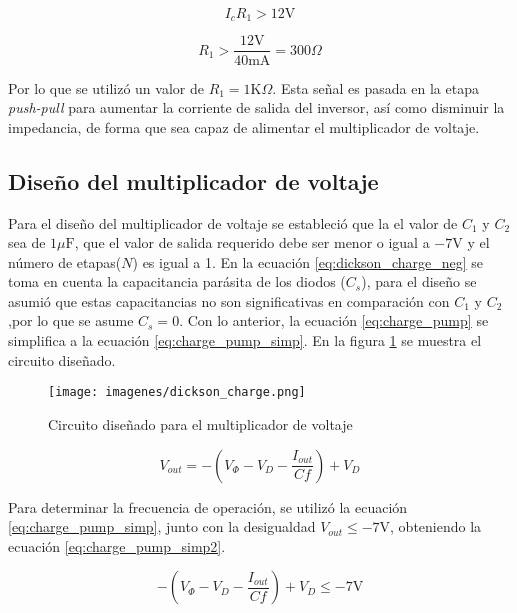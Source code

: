     $$
        I_cR_1 > 12\text{V}
    $$
    
   
    $$
        R_1 > \frac{12\text{V}}{40\text{mA}} = 300 \Omega
    $$

    
    Por lo que se utilizó un valor de $R_1 = 1\text{K}\Omega$. Esta señal es 
    pasada en la etapa \textit{push-pull} para aumentar la corriente de salida
    del inversor, así como disminuir la impedancia, de forma que sea 
    capaz de alimentar el multiplicador de voltaje.

    \subsection{Diseño del multiplicador de voltaje}

    Para el diseño del multiplicador de voltaje se estableció que la 
    el valor de $C_1$ y $C_2$ sea de
    $1\mu\text{F}$, que el valor de salida requerido debe ser menor o igual
    a $-7\text{V}$ y el número de etapas($N$) es igual a 1. En la 
    ecuación \ref{eq:dickson_charge_neg}  se toma en cuenta la
    capacitancia parásita de los diodos ($C_s$), para el diseño se asumió
    que estas capacitancias no son significativas en comparación con 
    $C_1$ y $C_2$,por lo que se asume $C_s = 0$.
    Con lo anterior, la ecuación \ref{eq:charge_pump} se simplifica a la
    ecuación \ref{eq:charge_pump_simp}. En la figura \ref{fig:charge_pump_dis}
    se muestra el circuito diseñado.

    \begin{figure}[H]
        \centering
        \texttt{[image: imagenes/dickson\_charge.png]}
        \caption{Circuito diseñado para el multiplicador de voltaje}
        \label{fig:charge_pump_dis}
    \end{figure}

    \begin{equation}
        V_{out} = -\left(V_\Phi - V_D - \frac{I_{out}}{Cf}  \right) + V_D
        \label{eq:charge_pump_simp}
    \end{equation}

    Para determinar la frecuencia de operación, se utilizó la ecuación 
    \ref{eq:charge_pump_simp}, junto con la desigualdad 
    $V_{out} \leq -7\text{V}$, obteniendo la ecuación 
    \ref{eq:charge_pump_simp2}.

    \begin{equation}
        -\left(V_\Phi - V_D - \frac{I_{out}}{Cf}\right) + V_D \leq -7\text{V}
        \label{eq:charge_pump_simp2}    
    \end{equation}

